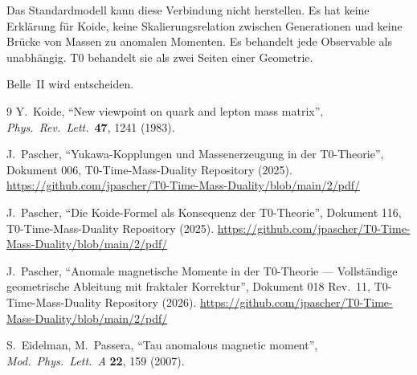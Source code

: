 Das Standardmodell kann diese Verbindung nicht herstellen. Es hat keine Erklärung für Koide, keine Skalierungsrelation zwischen Generationen und keine Brücke von Massen zu anomalen Momenten. Es behandelt jede Observable als unabhängig. T0 behandelt sie als zwei Seiten einer Geometrie.

Belle~II wird entscheiden.

\begin{thebibliography}{9}
	 Y.~Koide, ``New viewpoint on quark and lepton mass matrix'', 
	\textit{Phys.\ Rev.\ Lett.}\ \textbf{47}, 1241 (1983).
	
	 J.~Pascher, ``Yukawa-Kopplungen und Massenerzeugung in der T0-Theorie'', 
	Dokument 006, T0-Time-Mass-Duality Repository (2025).
	\url{https://github.com/jpascher/T0-Time-Mass-Duality/blob/main/2/pdf/}
	
	 J.~Pascher, ``Die Koide-Formel als Konsequenz der T0-Theorie'', 
	Dokument 116, T0-Time-Mass-Duality Repository (2025).
	\url{https://github.com/jpascher/T0-Time-Mass-Duality/blob/main/2/pdf/}
	
	 J.~Pascher, ``Anomale magnetische Momente in der T0-Theorie — Vollständige geometrische Ableitung mit fraktaler Korrektur'', 
	Dokument 018 Rev.~11, T0-Time-Mass-Duality Repository (2026).
	\url{https://github.com/jpascher/T0-Time-Mass-Duality/blob/main/2/pdf/}
	
	 S.~Eidelman, M.~Passera, ``Tau anomalous magnetic moment'', 
	\textit{Mod.\ Phys.\ Lett.\ A} \textbf{22}, 159 (2007).
\end{thebibliography}
